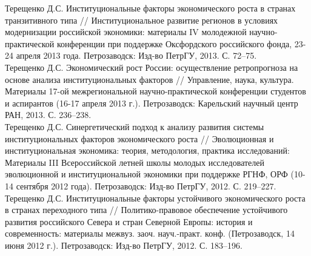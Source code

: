 \documentclass[10pt]{article}
\newcommand{\years}[1]{\marginnote{\scriptsize #1}}
\begin{document}
\years{2013}Терещенко Д.С. Институциональные факторы экономического роста в странах транзитивного типа // Институциональное развитие регионов в условиях модернизации российской экономики: материалы IV молодежной научно-практической конференции при поддержке Оксфордского российского фонда, 23-24 апреля 2013 года. Петрозаводск: Изд-во ПетрГУ, 2013. С. 72–75.\\
\years{2013}Терещенко Д.С. Экономический рост России: осуществление ретропрогноза на основе анализа институциональных факторов // Управление, наука, культура. Материалы 17-ой межрегиональной научно-практической конференции студентов и аспирантов (16-17 апреля 2013 г.). Петрозаводск: Карельский научный центр РАН, 2013. С. 236–238.\\
\years{2012}Терещенко Д.С. Синергетический подход к анализу развития системы институциональных факторов экономического роста // Эволюционная и институциональная экономика: теория, методология, практика исследований: Материалы III Всероссийской летней школы молодых исследователей эволюционной и институциональной экономики при поддержке РГНФ, ОРФ (10-14 сентября 2012 года). Петрозаводск: Изд-во ПетрГУ, 2012. С. 219–227.\\
\years{2012}Терещенко Д.С. Институциональные факторы устойчивого экономического роста в странах переходного типа // Политико-правовое обеспечение устойчивого развития российского Севера и стран Северной Европы: история и современность: материалы межвуз. заоч. науч.-практ. конф. (Петрозаводск, 14 июня 2012 г.). Петрозаводск: Изд-во ПетрГУ, 2012. С. 183–196.\\
\end{document}
